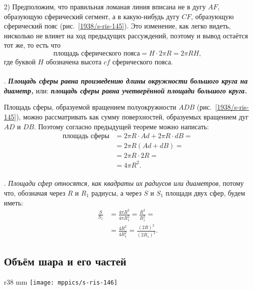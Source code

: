 2) Предположим, что правильная ломаная линия вписана не в дугу $AF$, образующую сферический сегмент, а в какую-нибудь дугу $CF$, образующую сферический пояс (рис.~\ref{1938/s-ris-145}).
Это изменение, как легко видеть, нисколько не влияет на ход предыдущих рассуждений, поэтому и вывод остаётся тот же, то есть что
\[\text{площадь сферического пояса} = H \cdot 2\pi R = 2\pi RH,\]
где буквой $H$ обозначена высота $cf$ сферического пояса.

\paragraph{}\label{1938/s138}
.
\textbf{\emph{Площадь сферы равна произведению длины окружности большого круга на диаметр,}} или: \textbf{\emph{площадь сферы равна учетверённой площади большого круга.}}

Площадь сферы, образуемой вращением полуокружности $ADB$ (рис.~\ref{1938/s-ris-145}), можно рассматривать как сумму поверхностей, образуемых вращением дуг $AD$ и $DB$.
Поэтому согласно предыдущей теореме можно написать:
\begin{align*}
\text{площадь сферы} &= 2\pi R\cdot Ad + 2\pi R\cdot dB =
\\
&=2\pi R(Ad + dB) =
\\
&= 2\pi R\cdot 2R = 
\\
&=4\pi R^2.
\end{align*}

\paragraph{}\label{1938/s139}
.
\emph{Площади сфер относятся, как квадраты их радиусов или диаметров}, потому что, обозначая через $R$ и $R_1$ радиусы, а через $S$ и $S_1$ площади двух сфер, будем иметь:
\begin{align*}
\frac{S}{S_1} &= \frac{4\pi R^2}{4\pi R^2_1} =\frac{R^2}{R^2_1} = 
\\&=\frac{4R^2}{4R_1^2} =\frac{(2R)^2}{(2R_1)^2}.
\end{align*}

\subsection*{Объём шара и его частей}

\begin{wrapfigure}{r}{38 mm}
\vskip-0mm
\centering
\texttt{[image: mppics/s-ris-146]}
\caption{}\label{1938/s-ris-146}
\vskip-0mm
\end{wrapfigure}

